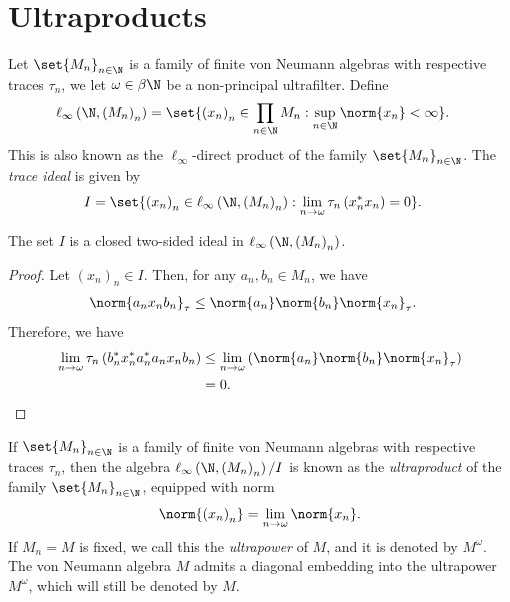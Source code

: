 \documentclass[10pt]{mypackage}
\begin{document}
\section{Ultraproducts}%
Let $\set{M_n}_{n\in \N}$ is a family of finite von Neumann algebras with respective traces $\tau_n$, we let $\omega\in \beta\N$ be a non-principal ultrafilter. Define
\begin{align*}
  \ell_{\infty}\left( \N,\left( M_n \right)_n \right) &= \set{\left( x_n \right)_n\in \prod_{n\in\N}M_n : \sup_{n\in\N}\norm{x_n} < \infty}.
\end{align*}
This is also known as the $\ell_{\infty}$-direct product of the family $\set{M_n}_{n\in \N}$. The \textit{trace ideal} is given by
\begin{align*}
  I &= \set{\left( x_n \right)_n\in \ell_{\infty}\left( \N,\left( M_n \right)_n \right) : \lim_{n\rightarrow \omega}\tau_n\left( x_n^{\ast}x_n \right) = 0}.
\end{align*}
\begin{proposition}
  The set $I$ is a closed two-sided ideal in $\ell_{\infty}\left( \N,\left( M_n \right)_n \right)$.
\end{proposition}
\begin{proof}
  Let $\left( x_n \right)_n\in I$. Then, for any $a_n,b_n\in M_n$, we have
  \begin{align*}
    \norm{a_nx_nb_n}_{\tau} &\leq \norm{a_n}\norm{b_n}\norm{x_n}_{\tau}.
  \end{align*}
  Therefore, we have
  \begin{align*}
    \lim_{n\rightarrow\omega} \tau_n\left( b_n^{\ast}x_n^{\ast}a_n^{\ast}a_nx_nb_n \right) &\leq \lim_{n\rightarrow\omega} \left( \norm{a_n}\norm{b_n}\norm{x_n}_{\tau} \right)\\
                                                                                           &= 0.
  \end{align*}
\end{proof}
\begin{definition}
  If $\set{M_n}_{n\in \N}$ is a family of finite von Neumann algebras with respective traces $\tau_n$, then the algebra $\ell_{\infty}\left( \N,\left( M_n \right)_n \right)/I$ is known as the \textit{ultraproduct} of the family $\set{M_n}_{n\in \N}$, equipped with norm
  \begin{align*}
    \norm{\left( x_n \right)_n} = \lim_{n\rightarrow\omega}\norm{x_n}.
  \end{align*}
  If $M_n = M$ is fixed, we call this the \textit{ultrapower} of $M$, and it is denoted by $M^{\omega}$. The von Neumann algebra $M$ admits a diagonal embedding into the ultrapower $M^{\omega}$, which will still be denoted by $M$.
\end{definition}
\end{document}
